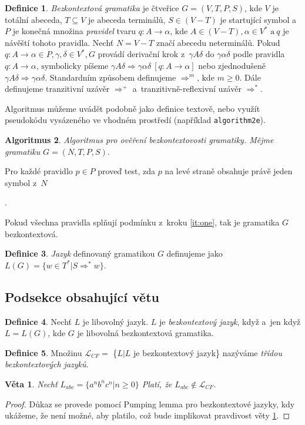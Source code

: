 \documentclass[11pt,a4paper,twocolumn,titlepage]{article}
\theoremstyle{definition}
\newtheorem{definition}{Definice}[section]
\newtheorem{algorithm}[definition]{Algoritmus}
\theoremstyle{plain}
\newtheorem{sentence}{Věta}
\begin{document}
\begin{definition} \label{def:one}
\emph{Bezkontextová gramatika} je čtveřice $G=(V,T,P,S)$, kde $V$ je totální 
abeceda, $T \subseteq V$ je abeceda terminálů, $S \in (V-T)$ je startující symbol a~$P$ je konečná množina \emph{pravidel}
tvaru $q\colon A \rightarrow \alpha\mbox{, kde }A \in (V-T), \alpha \in V^*\mbox{ a}~q$ je návěští tohoto pravidla. 
Nechť $N=V-T$ značí abecedu neterminálů.
Pokud $q\colon A \rightarrow \alpha \in P, \gamma, \delta \in V^*,G$ provádí derivační 
krok z~${\gamma}A{\delta}\mbox{ do }\gamma\alpha\delta$ podle
 pravidla $q\colon A \rightarrow \alpha\mbox{, symbolicky píšeme }{\gamma}A{\delta} \Rightarrow \gamma\alpha\delta\ [q\colon A \rightarrow \alpha]$ nebo zjednodušeně ${\gamma}A{\delta} \Rightarrow \gamma\alpha\delta$. 
Standardním způsobem definujeme $\Rightarrow^m\mbox{, kde }m\geq0$. Dále definujeme 
tranzitivní uzávěr $\Rightarrow^+$ a~tranzitivně-reflexivní uzávěr $\Rightarrow^*$.
\medskip

Algoritmus můžeme uvádět podobně jako definice textově, nebo využít pseudokódu vysázeného ve vhodném 
prostředí (například \texttt{algorithm2e}).
\end{definition}
\begin{algorithm}
\emph{Algoritmus pro ověření bezkontextovosti gramatiky. Mějme gramatiku} $G=(N,T,P,S)$.
	\begin{enumerate}
		{\itshape\item\label{it:one}Pro každé pravidlo $p \in P$ proveď test, zda $p$ na levé straně obsahuje právě jeden symbol z~$N$}.
		{\itshape\item Pokud všechna pravidla splňují podmínku z~kroku \ref{it:one}, tak je gramatika $G$ bezkontextová.}
	\end{enumerate}
\end{algorithm}
\begin{definition}
\emph{Jazyk} definovaný gramatikou $G$ definujeme jako $L(G)=\{w \in T^*|S\Rightarrow^* w\}$.
\end{definition}
\subsection{Podsekce obsahující větu}
\begin{definition}
Nechť $L$ je libovolný jazyk. $L$ je \emph{bezkontextový jazyk}, když a~jen když $L=L(G)$, kde $G$ je libovolná bezkontextová gramatika.
\end{definition}
\begin{definition}
Množinu $\mathcal{L}_{CF} =$ \{$L|L$ {je bezkontextový jazyk}\} nazýváme \emph{třídou bezkontextových jazyků}.
\end{definition}
\begin{sentence} \label{sen:one}
\emph{Nechť $L_{abc}=\{a^nb^nc^n|n\geq0\}$ Platí, že $L_{abc} \notin \mathcal{L}_{CF}$}.
\end{sentence}
\begin{proof}
Důkaz se provede pomocí Pumping lemma pro bezkontextové jazyky, kdy ukážeme, že není možné, aby platilo, což bude 
implikovat pravdivost věty \ref{sen:one}.
\end{proof}
\end{document}
